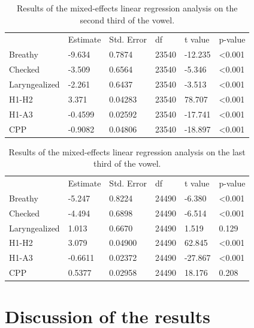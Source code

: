 \documentclass[12pt, letterpaper]{article}
\providecommand{\lsptoprule}{\midrule\toprule}
\providecommand{\lspbottomrule}{\bottomrule\midrule}
\begin{document}
\begin{table}[!h]
	\centering
	\caption{Results of the mixed-effects linear regression analysis on the second third of the vowel. }
	\label{tab:Second}
	 \begin{tabular}{llllll}
	  \lsptoprule
						&  Estimate  & Std. Error & df & t value & p-value \\
	  	Breathy   		&  -9.634 	& 0.7874	& 23540 & -12.235 & <0.001\\
		Checked    		&  -3.509	& 0.6564	& 23540 & -5.346 & <0.001 \\
		Laryngealized	& -2.261	& 0.6437	& 23540	& -3.513 & <0.001 \\
		H1-H2			& 3.371		& 0.04283	& 23540	 & 78.707 & <0.001\\
		H1-A3			& -0.4599	& 0.02592	& 23540	& -17.741	& <0.001\\
		CPP				& -0.9082	& 0.04806	& 23540	& -18.897	& <0.001\\
	  \lspbottomrule
	 \end{tabular}
\end{table}

\begin{table}[!h]
	\centering
	\caption{Results of the mixed-effects linear regression analysis on the last third of the vowel. }
	\label{tab:Third}
	 \begin{tabular}{llllll}
	  \lsptoprule
						&  Estimate  & Std. Error & df & t value & p-value \\
	  	Breathy   		& -5.247  	& 0.8224	&  24490	& -6.380	& <0.001\\
		Checked    		& -4.494  	& 0.6898	&  24490	& -6.514	& <0.001 \\
		Laryngealized	& 1.013		& 0.6670	&  24490	& 1.519		& 0.129 \\
		H1-H2			& 3.079		& 0.04900	&  24490	& 62.845	& <0.001\\
		H1-A3			& -0.6611 	& 0.02372	&  24490	& -27.867	& <0.001\\
		CPP				& 0.5377	& 0.02958	&  24490	& 18.176	& 0.208\\
	  \lspbottomrule
	 \end{tabular}
\end{table}

\section{Discussion of the results} \label{sec:Discussion}
\end{document}
